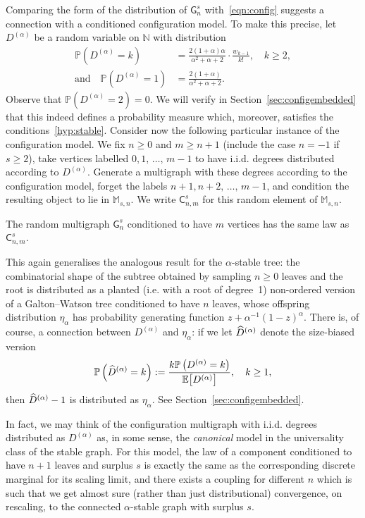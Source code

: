 \documentclass[10pt]{amsart}
\theoremstyle{definition}\newtheorem{defi}[theo]{Definition}\newtheorem{rema}[theo]{Remark}\newtheorem{exam}[theo]{Example}\newtheorem{exem}[theo]{Example}\newtheorem{nota}[theo]{Notation}
\newcommand{\sG}{\mathsf{G}}
\newcommand{\sC}{\mathsf{C}}
\newcommand{\M}{\mathbb{M}}
\newcommand{\N}{\mathbb{N}}
\newcommand{\bbE}{\mathbb{E}}
\newcommand{\bbP}{\mathbb{P}}
\let\oldhat\hat
\renewcommand*{\hat}[1]{\mathchoice{\widehat{#1}}{\widehat{#1}}{\oldhat{#1}}{\oldhat{#1}}}
\begin{document}
Comparing the form of the distribution of $\sG_n^s$ with~\eqref{eqn:config} suggests a connection with a conditioned configuration model. To make this precise, let $D^{(\alpha)}$ be a random variable on $\N$ with distribution
\begin{equation}\label{def:Dalpha}
\begin{split}
\bbP\left(D^{(\alpha)}=k\right) &= \frac{2(1+\alpha)\alpha}{\alpha^2+\alpha+2} \cdot \frac{w_{k-1}}{k!}, \quad k \geq 2, \\
\text{and} \quad \bbP\left(D^{(\alpha)}=1\right) &= \frac{2(1+\alpha)}{\alpha^2+\alpha+2}.
\end{split}
\end{equation}
Observe that $\bbP(D^{(\alpha)} = 2) = 0$. We will verify in Section~\ref{sec:configembedded} that this indeed defines a probability measure which, moreover, satisfies the conditions~\eqref{hyp:stable}. Consider now the following particular instance of the configuration model. We fix $n \ge 0$ and $m \ge n+1$ (include the case $n=-1$ if $s\geq 2$), take vertices labelled $0, 1,\,\ldots,\,m-1$ to have i.i.d. degrees distributed according to $D^{(\alpha)}$. Generate a multigraph with these degrees according to the configuration model, forget the labels $n+1, n+2, \,\ldots,\,m-1$, and condition the resulting object to lie in $\M_{s,n}$. We write $\sC_{n,m}^s$ for this random element of $\M_{s,n}$.

\begin{coro}\label{cor:identification}
The random multigraph $\sG_{n}^s$ conditioned to have $m$ vertices has the same law as $\sC_{n,m}^s$.
\end{coro}

This again generalises the analogous result for the $\alpha$-stable tree: the combinatorial shape of the subtree obtained by sampling $n \geq 0$ leaves and the root is distributed as a planted (i.e. with a root of degree~1) non-ordered version of a Galton--Watson tree conditioned to have $n$ leaves, whose offspring distribution $\eta_\alpha$ has probability generating function $z+\alpha^{-1}(1-z)^{\alpha}$. There is, of course, a connection between $D^{(\alpha)}$ and $\eta_\alpha$: if we let $\hat{D}^{(\alpha)}$ denote the size-biased version
\[
\bbP\left(\hat{D}^{(\alpha)}=k\right):= \frac{k \bbP\left(D^{(\alpha)}=k\right)}{\bbE\big[D^{(\alpha)}\big]}, \quad k \geq 1,
\]
then $\hat{D}^{(\alpha)}-1$ is distributed as $\eta_\alpha$. See Section~\ref{sec:configembedded}.

In fact, we may think of the configuration multigraph with i.i.d. degrees distributed as $D^{(\alpha)}$ as, in some sense, the \emph{canonical} model in the universality class of the stable graph. For this model, the law of a component conditioned to have $n+1$ leaves and surplus $s$ is exactly the same as the corresponding discrete marginal for its scaling limit, and there exists a coupling for different $n$ which is such that we get almost sure (rather than just distributional) convergence, on rescaling, to the connected $\alpha$-stable graph with surplus $s$.
\end{document}

